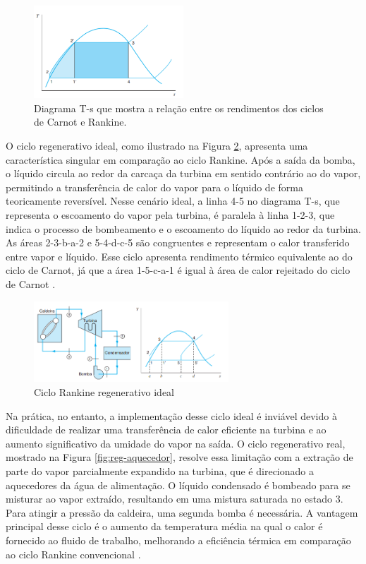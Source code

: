 \documentclass[
	article,			%
	11pt,				%
	oneside,			%
	a4paper,			%
	english,			%
	brazil,				%
	sumario=tradicional
	]{abntex2}
\begin{document}
\begin{figure}[h]
	\centering
	\includegraphics[width=0.5\textwidth]{./images/regeneracao.png}
	\caption{Diagrama T-s que mostra a relação entre os rendimentos dos ciclos de Carnot e Rankine.}
	\label{fig:regerenacao}
\end{figure}

O ciclo regenerativo ideal, como ilustrado na Figura \ref{fig:regenerativo}, apresenta uma característica singular em comparação ao ciclo Rankine. Após a saída da bomba, o líquido circula ao redor da carcaça da turbina em sentido contrário ao do vapor, permitindo a transferência de calor do vapor para o líquido de forma teoricamente reversível. Nesse cenário ideal, a linha 4-5 no diagrama T-s, que representa o escoamento do vapor pela turbina, é paralela à linha 1-2-3, que indica o processo de bombeamento e o escoamento do líquido ao redor da turbina. As áreas 2-3-b-a-2 e 5-4-d-c-5 são congruentes e representam o calor transferido entre vapor e líquido. Esse ciclo apresenta rendimento térmico equivalente ao do ciclo de Carnot, já que a área 1-5-c-a-1 é igual à área de calor rejeitado do ciclo de Carnot \cite{borgnakke-2020}.

\begin{figure}[h]
	\centering
	\includegraphics[width=0.65\textwidth]{./images/regenerativo.png}
	\caption{Ciclo Rankine regenerativo ideal}
	\label{fig:regenerativo}
\end{figure}

Na prática, no entanto, a implementação desse ciclo ideal é inviável devido à dificuldade de realizar uma transferência de calor eficiente na turbina e ao aumento significativo da umidade do vapor na saída. O ciclo regenerativo real, mostrado na Figura \ref{fig:reg-aquecedor}, resolve essa limitação com a extração de parte do vapor parcialmente expandido na turbina, que é direcionado a aquecedores da água de alimentação. O líquido condensado é bombeado para se misturar ao vapor extraído, resultando em uma mistura saturada no estado 3. Para atingir a pressão da caldeira, uma segunda bomba é necessária. A vantagem principal desse ciclo é o aumento da temperatura média na qual o calor é fornecido ao fluido de trabalho, melhorando a eficiência térmica em comparação ao ciclo Rankine convencional \cite{borgnakke-2020}.
\end{document}
